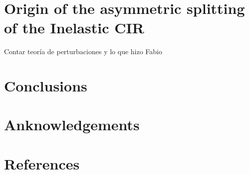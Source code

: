 \documentclass[aps,pre,twocolumn,superscriptaddress,showpacs]{revtex4-1}
\begin{document}
\section{Origin of the asymmetric splitting of the Inelastic CIR} \label{sec:perturbation}
Contar teoría de perturbaciones y lo que hizo Fabio

\section{Conclusions}
\section*{Anknowledgements}
\section*{References}



\newpage
\end{document}
